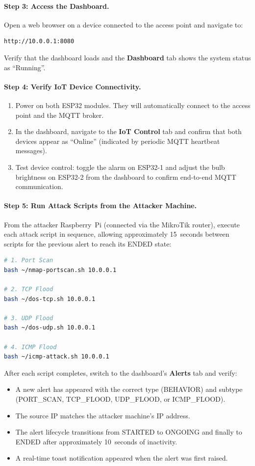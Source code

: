 \documentclass[12pt,a4paper]{article}
\begin{document}
\paragraph{Step 3: Access the Dashboard.}
Open a web browser on a device connected to the access point and navigate to:
\begin{lstlisting}[frame=none,backgroundcolor=\color{white}]
http://10.0.0.1:8080
\end{lstlisting}
Verify that the dashboard loads and the \textbf{Dashboard} tab shows the system status as ``Running''.

\paragraph{Step 4: Verify IoT Device Connectivity.}
\begin{enumerate}
    \item Power on both ESP32 modules. They will automatically connect to the access point and the MQTT broker.
    \item In the dashboard, navigate to the \textbf{IoT Control} tab and confirm that both devices appear as ``Online'' (indicated by periodic MQTT heartbeat messages).
    \item Test device control: toggle the alarm on ESP32-1 and adjust the bulb brightness on ESP32-2 from the dashboard to confirm end-to-end MQTT communication.
\end{enumerate}

\paragraph{Step 5: Run Attack Scripts from the Attacker Machine.}
From the attacker Raspberry~Pi (connected via the MikroTik router), execute each attack script in sequence, allowing approximately 15~seconds between scripts for the previous alert to reach its ENDED state:

\begin{lstlisting}[language=bash]
# 1. Port Scan
bash ~/nmap-portscan.sh 10.0.0.1

# 2. TCP Flood
bash ~/dos-tcp.sh 10.0.0.1

# 3. UDP Flood
bash ~/dos-udp.sh 10.0.0.1

# 4. ICMP Flood
bash ~/icmp-attack.sh 10.0.0.1
\end{lstlisting}

After each script completes, switch to the dashboard's \textbf{Alerts} tab and verify:
\begin{itemize}
    \item A new alert has appeared with the correct type (BEHAVIOR) and subtype (PORT\_SCAN, TCP\_FLOOD, UDP\_FLOOD, or ICMP\_FLOOD).
    \item The source IP matches the attacker machine's IP address.
    \item The alert lifecycle transitions from STARTED to ONGOING and finally to ENDED after approximately 10~seconds of inactivity.
    \item A real-time toast notification appeared when the alert was first raised.
\end{itemize}
\end{document}
